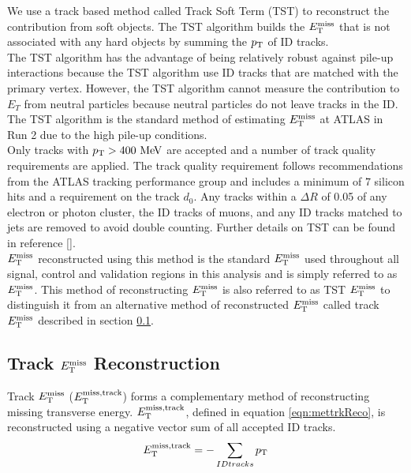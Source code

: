 \indent We use a track based method called Track Soft Term (TST) \cite{METReco} to reconstruct the contribution from soft objects.  The TST algorithm builds the $E_{\mathrm{T}}^{\mathrm{miss}}$ that is not associated with any hard objects by summing the $p_{\mathrm{T}}$ of ID tracks. \\

\indent The TST algorithm has the advantage of being relatively robust against pile-up interactions because the TST algorithm use ID tracks that are matched with the primary vertex. However, the TST algorithm cannot measure the contribution to $E_T$ from neutral particles because neutral particles do not leave tracks in the ID.  The TST algorithm is the standard method of estimating $E_{\mathrm{T}}^{\mathrm{miss}}$ at ATLAS in Run 2 due to the high pile-up conditions. \\

\indent  Only tracks with $\pt > 400 \mev$ are accepted and a number of track quality requirements are applied.  The track quality requirement follows recommendations from the ATLAS tracking performance group and includes a minimum of $7$ silicon hits and a requirement on the track $d_0$.  Any tracks within a $\Delta R$ of 0.05 of any electron or photon cluster, the ID tracks of muons, and any ID tracks matched to jets are removed to avoid double counting.  Further details on TST can be found in reference [\cite{METReco}].  \\

\indent $E_{\mathrm{T}}^{\mathrm{miss}}$ reconstructed using this method is the standard $E_{\mathrm{T}}^{\mathrm{miss}}$ used throughout all signal, control and validation regions in this analysis and is simply referred to as $E_{\mathrm{T}}^{\mathrm{miss}}$.  This method of reconstructing $E_{\mathrm{T}}^{\mathrm{miss}}$ is also referred to as TST $E_{\mathrm{T}}^{\mathrm{miss}}$ to distinguish it from an alternative method of reconstructed $E_{\mathrm{T}}^{\mathrm{miss}}$ called track $E_{\mathrm{T}}^{\mathrm{miss}}$ described in section \ref{sec:reco:trkMET}. \\

\subsection{Track $E_{\mathrm{T}}^{\mathrm{miss}}$ Reconstruction}
\label{sec:reco:trkMET}

\indent Track $E_{\mathrm{T}}^{\mathrm{miss}}$ ($E_{\mathrm{T}}^{\mathrm{miss, track}}$) forms a complementary method of reconstructing missing transverse energy.  $E_{\mathrm{T}}^{\mathrm{miss, track}}$, defined in equation \ref{eqn:mettrkReco}, is reconstructed using a negative vector sum of all accepted ID tracks.  \\

\begin{equation}
E_{\mathrm{T}}^{\mathrm{miss, track}} = - \sum_{ID tracks} p_{\mathrm{T}}  
\label{eqn:mettrkReco}
\end{equation}

